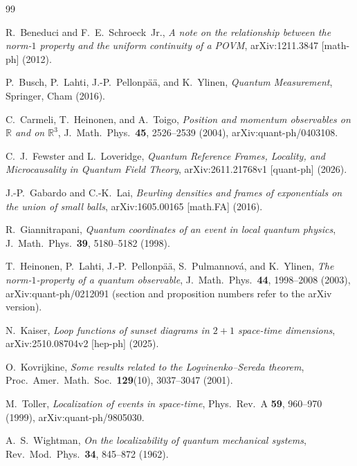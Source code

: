 \documentclass[11pt,a4paper]{article}
\theoremstyle{definition}
\theoremstyle{remark}
\newcommand{\RR}{\mathbb{R}}
\begin{document}
\begin{thebibliography}{99}

R.~Beneduci and F.~E.~Schroeck~Jr.,
\emph{A note on the relationship between the norm-$1$ property and the uniform continuity of a POVM},
arXiv:1211.3847 [math-ph] (2012).

P.~Busch, P.~Lahti, J.-P.~Pellonp\"a\"a, and K.~Ylinen,
\emph{Quantum Measurement},
Springer, Cham (2016).

C.~Carmeli, T.~Heinonen, and A.~Toigo,
\emph{Position and momentum observables on $\RR$ and on $\RR^3$},
J.\ Math.\ Phys.\ \textbf{45}, 2526--2539 (2004), arXiv:quant-ph/0403108.

C.~J.~Fewster and L.~Loveridge,
\emph{Quantum Reference Frames, Locality, and Microcausality in Quantum Field Theory},
arXiv:2611.21768v1 [quant-ph] (2026).

J.-P.~Gabardo and C.-K.~Lai,
\emph{Beurling densities and frames of exponentials on the union of small balls},
arXiv:1605.00165 [math.FA] (2016).

R.~Giannitrapani,
\emph{Quantum coordinates of an event in local quantum physics},
J.\ Math.\ Phys.\ \textbf{39}, 5180--5182 (1998).

T.~Heinonen, P.~Lahti, J.-P.~Pellonp\"a\"a, S.~Pulmannov\'a, and K.~Ylinen,
\emph{The norm-$1$-property of a quantum observable},
J.\ Math.\ Phys.\ \textbf{44}, 1998--2008 (2003), arXiv:quant-ph/0212091 (section and proposition numbers refer to the arXiv version).

N.~Kaiser,
\emph{Loop functions of sunset diagrams in $2+1$ space-time dimensions},
arXiv:2510.08704v2 [hep-ph] (2025).

O.~Kovrijkine,
\emph{Some results related to the Logvinenko--Sereda theorem},
Proc.\ Amer.\ Math.\ Soc.\ \textbf{129}(10), 3037--3047 (2001).

M.~Toller,
\emph{Localization of events in space-time},
Phys.\ Rev.\ A \textbf{59}, 960--970 (1999), arXiv:quant-ph/9805030.

A.~S.~Wightman,
\emph{On the localizability of quantum mechanical systems},
Rev.\ Mod.\ Phys.\ \textbf{34}, 845--872 (1962).

\end{thebibliography}
\end{document}
